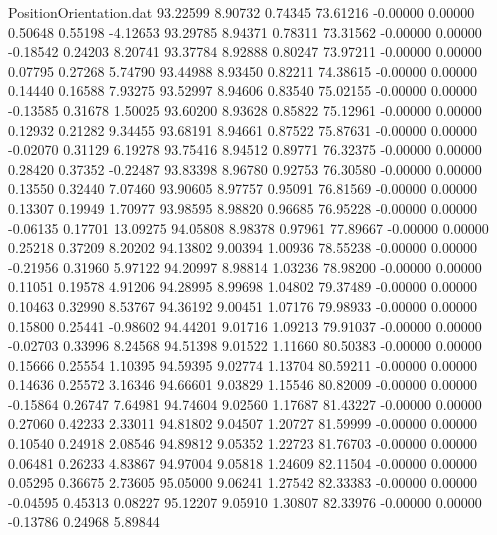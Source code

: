 \begin{filecontents}{PositionOrientation.dat}
  93.22599    8.90732    0.74345    73.61216   -0.00000    0.00000    0.50648    0.55198   -4.12653
  93.29785    8.94371    0.78311    73.31562   -0.00000    0.00000   -0.18542    0.24203    8.20741
  93.37784    8.92888    0.80247    73.97211   -0.00000    0.00000    0.07795    0.27268    5.74790
  93.44988    8.93450    0.82211    74.38615   -0.00000    0.00000    0.14440    0.16588    7.93275
  93.52997    8.94606    0.83540    75.02155   -0.00000    0.00000   -0.13585    0.31678    1.50025
  93.60200    8.93628    0.85822    75.12961   -0.00000    0.00000    0.12932    0.21282    9.34455
  93.68191    8.94661    0.87522    75.87631   -0.00000    0.00000   -0.02070    0.31129    6.19278
  93.75416    8.94512    0.89771    76.32375   -0.00000    0.00000    0.28420    0.37352   -0.22487
  93.83398    8.96780    0.92753    76.30580   -0.00000    0.00000    0.13550    0.32440    7.07460
  93.90605    8.97757    0.95091    76.81569   -0.00000    0.00000    0.13307    0.19949    1.70977
  93.98595    8.98820    0.96685    76.95228   -0.00000    0.00000   -0.06135    0.17701   13.09275
  94.05808    8.98378    0.97961    77.89667   -0.00000    0.00000    0.25218    0.37209    8.20202
  94.13802    9.00394    1.00936    78.55238   -0.00000    0.00000   -0.21956    0.31960    5.97122
  94.20997    8.98814    1.03236    78.98200   -0.00000    0.00000    0.11051    0.19578    4.91206
  94.28995    8.99698    1.04802    79.37489   -0.00000    0.00000    0.10463    0.32990    8.53767
  94.36192    9.00451    1.07176    79.98933   -0.00000    0.00000    0.15800    0.25441   -0.98602
  94.44201    9.01716    1.09213    79.91037   -0.00000    0.00000   -0.02703    0.33996    8.24568
  94.51398    9.01522    1.11660    80.50383   -0.00000    0.00000    0.15666    0.25554    1.10395
  94.59395    9.02774    1.13704    80.59211   -0.00000    0.00000    0.14636    0.25572    3.16346
  94.66601    9.03829    1.15546    80.82009   -0.00000    0.00000   -0.15864    0.26747    7.64981
  94.74604    9.02560    1.17687    81.43227   -0.00000    0.00000    0.27060    0.42233    2.33011
  94.81802    9.04507    1.20727    81.59999   -0.00000    0.00000    0.10540    0.24918    2.08546
  94.89812    9.05352    1.22723    81.76703   -0.00000    0.00000    0.06481    0.26233    4.83867
  94.97004    9.05818    1.24609    82.11504   -0.00000    0.00000    0.05295    0.36675    2.73605
  95.05000    9.06241    1.27542    82.33383   -0.00000    0.00000   -0.04595    0.45313    0.08227
  95.12207    9.05910    1.30807    82.33976   -0.00000    0.00000   -0.13786    0.24968    5.89844

\end{filecontents}
